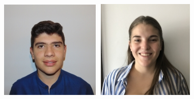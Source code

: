 \documentclass[11pt]{article}
\begin{document}
\begin{titlepage}
\begin{center}
        \begin{figure}[hbt!]
            \includegraphics[width=\linewidth]{Imagens/febras.png}
            \centering
            \captionsetup{A95349}
        \endminipage\hfill
            \includegraphics[width=\linewidth]{Imagens/Photo (2).jpg}

\end{figure}
\end{center}
\end{titlepage}
\end{document}
